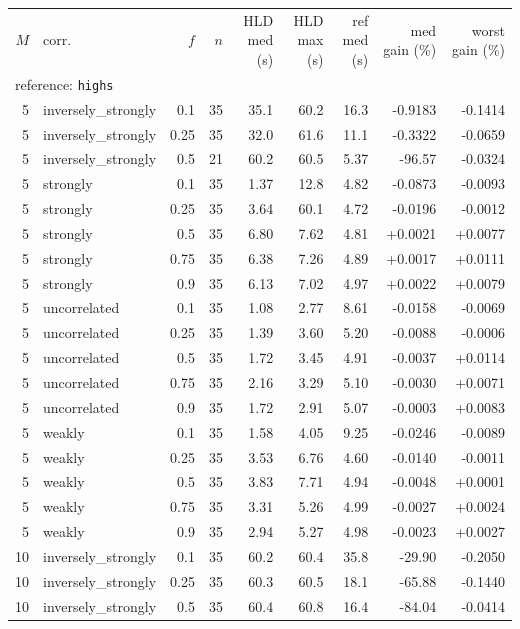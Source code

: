 \begin{tabular}{rlrrrrrrr}
\hline
$M$ & corr. & $f$ & $n$ & HLD med (s) & HLD max (s) & ref med (s) & med gain (\%) & worst gain (\%) \\
\multicolumn{9}{l}{reference: \texttt{highs}} \\
\hline
5 & inversely\_strongly & 0.1 & 35 & 35.1 & 60.2 & 16.3 & -0.9183 & -0.1414 \\
5 & inversely\_strongly & 0.25 & 35 & 32.0 & 61.6 & 11.1 & -0.3322 & -0.0659 \\
5 & inversely\_strongly & 0.5 & 21 & 60.2 & 60.5 & 5.37 & -96.57 & -0.0324 \\
5 & strongly & 0.1 & 35 & 1.37 & 12.8 & 4.82 & -0.0873 & -0.0093 \\
5 & strongly & 0.25 & 35 & 3.64 & 60.1 & 4.72 & -0.0196 & -0.0012 \\
5 & strongly & 0.5 & 35 & 6.80 & 7.62 & 4.81 & +0.0021 & +0.0077 \\
5 & strongly & 0.75 & 35 & 6.38 & 7.26 & 4.89 & +0.0017 & +0.0111 \\
5 & strongly & 0.9 & 35 & 6.13 & 7.02 & 4.97 & +0.0022 & +0.0079 \\
5 & uncorrelated & 0.1 & 35 & 1.08 & 2.77 & 8.61 & -0.0158 & -0.0069 \\
5 & uncorrelated & 0.25 & 35 & 1.39 & 3.60 & 5.20 & -0.0088 & -0.0006 \\
5 & uncorrelated & 0.5 & 35 & 1.72 & 3.45 & 4.91 & -0.0037 & +0.0114 \\
5 & uncorrelated & 0.75 & 35 & 2.16 & 3.29 & 5.10 & -0.0030 & +0.0071 \\
5 & uncorrelated & 0.9 & 35 & 1.72 & 2.91 & 5.07 & -0.0003 & +0.0083 \\
5 & weakly & 0.1 & 35 & 1.58 & 4.05 & 9.25 & -0.0246 & -0.0089 \\
5 & weakly & 0.25 & 35 & 3.53 & 6.76 & 4.60 & -0.0140 & -0.0011 \\
5 & weakly & 0.5 & 35 & 3.83 & 7.71 & 4.94 & -0.0048 & +0.0001 \\
5 & weakly & 0.75 & 35 & 3.31 & 5.26 & 4.99 & -0.0027 & +0.0024 \\
5 & weakly & 0.9 & 35 & 2.94 & 5.27 & 4.98 & -0.0023 & +0.0027 \\
10 & inversely\_strongly & 0.1 & 35 & 60.2 & 60.4 & 35.8 & -29.90 & -0.2050 \\
10 & inversely\_strongly & 0.25 & 35 & 60.3 & 60.5 & 18.1 & -65.88 & -0.1440 \\
10 & inversely\_strongly & 0.5 & 35 & 60.4 & 60.8 & 16.4 & -84.04 & -0.0414 \\

\end{tabular}
